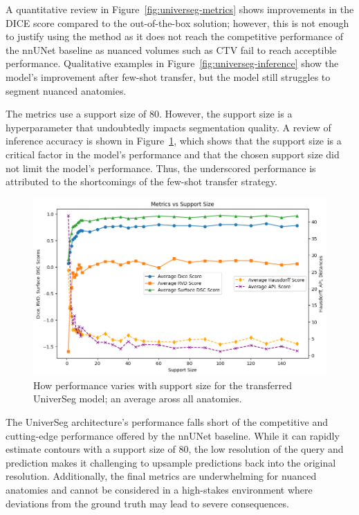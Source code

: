 \documentclass[11pt,twoside]{report}
\begin{document}
A quantitative review in Figure~\ref{fig:universeg-metrics} shows improvements in the DICE score compared to the out-of-the-box solution; however, this is not enough to justify using the method as it does not reach the competitive performance of the nnUNet baseline as nuanced volumes such as CTV fail to reach acceptible performance. Qualitative examples in Figure~\ref{fig:universeg-inference} show the model's improvement after few-shot transfer, but the model still struggles to segment nuanced anatomies.

The metrics use a support size of 80. However, the support size is a hyperparameter that undoubtedly impacts segmentation quality. A review of inference accuracy is shown in Figure~\ref{fig:universeg-support-size}, which shows that the support size is a critical factor in the model's performance and that the chosen support size did not limit the model's performance. Thus, the underscored performance is attributed to the shortcomings of the few-shot transfer strategy.

\begin{figure}[H]
  \centering
  \includegraphics[width=.7\linewidth]{../../research/source/code/UniverSeg/support_size_metric_implications_universeg.png}
  \caption{How performance varies with support size for the transferred UniverSeg model; an average aross all anatomies.}\label{fig:universeg-support-size}
\end{figure}


The UniverSeg architecture's performance falls short of the competitive and cutting-edge performance offered by the nnUNet baseline. While it can rapidly estimate contours with a support size of 80, the low resolution of the query and prediction makes it challenging to upsample predictions back into the original resolution. Additionally, the final metrics are underwhelming for nuanced anatomies and cannot be considered in a high-stakes environment where deviations from the ground truth may lead to severe consequences.
\end{document}

